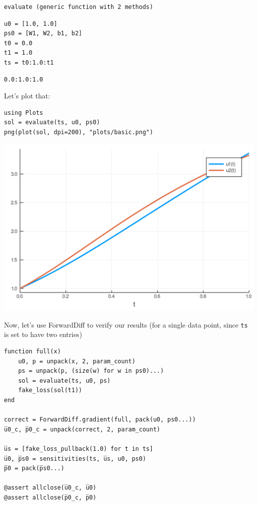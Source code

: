 \documentclass[11pt]{article}
\begin{document}
\begin{verbatim}
evaluate (generic function with 2 methods)
\end{verbatim}


\begin{verbatim}
u0 = [1.0, 1.0]
ps0 = [W1, W2, b1, b2]
t0 = 0.0
t1 = 1.0
ts = t0:1.0:t1
\end{verbatim}

\begin{verbatim}
0.0:1.0:1.0
\end{verbatim}


Let's plot that:
\begin{verbatim}
using Plots
sol = evaluate(ts, u0, ps0)
png(plot(sol, dpi=200), "plots/basic.png")
\end{verbatim}

\begin{center}
\includegraphics[width=.9\linewidth]{./plots/basic.png}
\end{center}

Now, let's use ForwardDiff to verify our results (for a single data point,
since \texttt{ts} is set to have two entries)

\begin{verbatim}
function full(x)
    u0, p = unpack(x, 2, param_count)
    ps = unpack(p, (size(w) for w in ps0)...)
    sol = evaluate(ts, u0, ps)
    fake_loss(sol(t1))
end

correct = ForwardDiff.gradient(full, pack(u0, ps0...))
u̅0_c, p̅0_c = unpack(correct, 2, param_count)

u̅s = [fake_loss_pullback(1.0) for t in ts]
u̅0, p̅s0 = sensitivities(ts, u̅s, u0, ps0)
p̅0 = pack(p̅s0...)

@assert allclose(u̅0_c, u̅0)
@assert allclose(p̅0_c, p̅0)
\end{verbatim}
\end{document}
